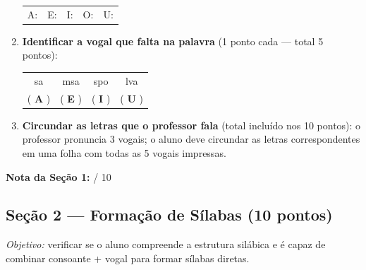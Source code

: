 \begin{avaliacao}
\begin{enumerate}
  \begin{center}
  \begin{tabular}{ccccc}
    A: \underline{\hspace{1.5cm}} &
    E: \underline{\hspace{1.5cm}} &
    I: \underline{\hspace{1.5cm}} &
    O: \underline{\hspace{1.5cm}} &
    U: \underline{\hspace{1.5cm}} \\
  \end{tabular}
  \end{center}

  \item \textbf{Identificar a vogal que falta na palavra} (1 ponto cada — total 5 pontos):

  \begin{center}
  \begin{tabular}{cccc}
    \underline{\hspace{0.8cm}}sa &
    m\underline{\hspace{0.8cm}}sa &
    s\underline{\hspace{0.8cm}}po &
    l\underline{\hspace{0.8cm}}va \\[0.3em]
    ( \textbf{A} ) &
    ( \textbf{E} ) &
    ( \textbf{I} ) &
    ( \textbf{U} ) \\
  \end{tabular}
  \end{center}

  \item \textbf{Circundar as letras que o professor fala} (total incluído nos 10 pontos):
  o professor pronuncia 3 vogais; o aluno deve circundar as letras correspondentes
  em uma folha com todas as 5 vogais impressas.
\end{enumerate}

\medskip
\noindent\textbf{Nota da Seção 1:} \underline{\hspace{1cm}} / 10

\subsection*{Seção 2 — Formação de Sílabas (10 pontos)}

\textit{Objetivo:} verificar se o aluno compreende a estrutura silábica
e é capaz de combinar consoante + vogal para formar sílabas diretas.


\end{avaliacao}
